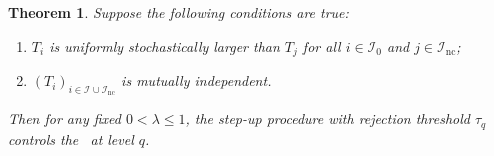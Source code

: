 \documentclass[a4paper,11pt]{article}
\newcommand{\zg}[1]{{\color{blue} [ZG: #1]}}
\theoremstyle{plain}
\newtheorem{theorem}{Theorem}[section]
\theoremstyle{definition}
\def\calI{\mathcal{I}}
\def\1{\mathbbm{1}}
\newcommand\independent{\protect\mathpalette{\protect\independenT}{\perp}}
\def\independenT#1#2{\mathrel{\rlap{$#1#2$}\mkern2mu{#1#2}}}
\theoremstyle{plain}
\def\independenT#1#2{\mathrel{\rlap{$#1#2$}\mkern2mu{#1#2}}}
\newcommand{\No}{{n}}
\newcommand{\NoNc}{m}
\newcommand{\pval}[1]{{p_{#1}}}
\newcommand{\testStatistics}[1]{{T_{#1}}}
\newcommand{\ncTestStatistics}[1]{{C_{#1}}}
\newcommand{\nickname}{{\text{RANC}}}
\newcommand{\hypothesisIndex}[1]{{\calI_{#1}}}
\newcommand{\nullHypothesisIndex}{{\calI_{0}}}
\newcommand{\FDR}{\text{FDR}}
\newcommand{\BH}{{\text{BH}}}
\newcommand{\stoppingTime}{{\tau_q}}
\begin{document}
\begin{theorem}\label{prop:FDR}
Suppose the following conditions are true:
\begin{enumerate}[label = (\alph*),ref = (\alph*)]
\item \label{FDR:assu:null.nc.uniformly.conservative}
  $\testStatistics{i}$ is uniformly stochastically larger than
  $\testStatistics{j}$ for all $i \in \nullHypothesisIndex$ and $j \in \hypothesisIndex{\text{nc}}$;
 \item \label{FDR:assu:independent}
 $(\testStatistics{i})_{i \in \hypothesisIndex{} \cup
   \hypothesisIndex{\text{nc}}}$ is mutually independent.
\end{enumerate}
Then for any fixed $0 < \lambda \leq 1$, the step-up procedure with
rejection threshold $\stoppingTime$
controls the \FDR~at level $q$.
\end{theorem}
\end{document}
